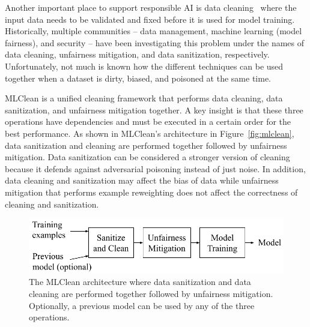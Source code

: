 \documentclass[11pt]{article}
\newcommand{\mc}{MLClean}
\begin{document}
Another important place to support responsible AI is data cleaning~\cite{DBLP:books/acm/IlyasC19} where the input data needs to be validated and fixed before it is used for model training. Historically, multiple communities -- data management, machine learning (model fairness), and security -- have been investigating this problem under the names of data cleaning, unfairness mitigation, and data sanitization, respectively. Unfortunately, not much is known how the different techniques can be used together when a dataset is dirty, biased, and poisoned at the same time. 

\mc{} is a unified cleaning framework that performs data cleaning, data sanitization, and unfairness mitigation together. A key insight is that these three operations have dependencies and must be executed in a certain order for the best performance. As shown in \mc{}'s architecture in Figure~\ref{fig:mlclean}, data sanitization and cleaning are performed together followed by unfairness mitigation. Data sanitization can be considered a stronger version of cleaning because it defends against adversarial poisoning instead of just noise. In addition, data cleaning and sanitization may affect the bias of data while unfairness mitigation that performs example reweighting does not affect the correctness of cleaning and sanitization. 

\begin{figure}[t]
  \centering
  \includegraphics[scale=0.7]{submissions/responsible-ai/figs/mlcleanarchitecture.pdf}
  \caption{The \mc{} architecture where data sanitization and data cleaning are performed together followed by unfairness mitigation. Optionally, a previous model can be used by any of the three operations.}
  \label{fig:mlcleanarchitecture}
\end{figure}
\end{document}
